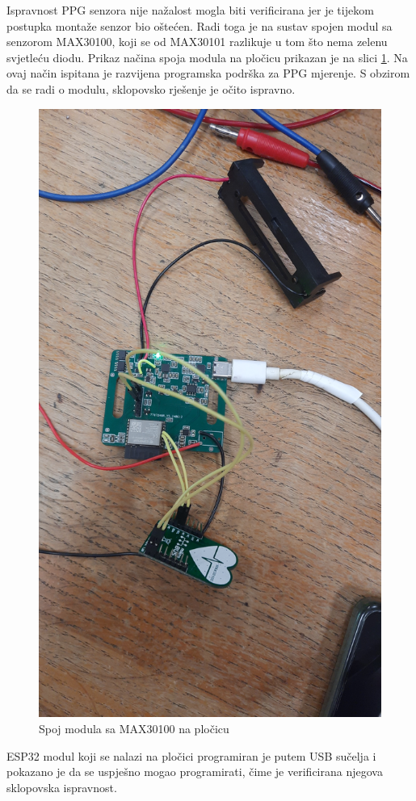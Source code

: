 Ispravnost PPG senzora nije nažalost mogla biti verificirana jer je tijekom postupka montaže senzor bio oštećen. Radi toga je na sustav spojen modul sa senzorom MAX30100, koji se od MAX30101 razlikuje u tom što nema zelenu svjetleću diodu. Prikaz načina spoja modula na pločicu prikazan je na slici \ref{slk:BR_TEST_05}. Na ovaj način ispitana je razvijena programska podrška za PPG mjerenje. S obzirom da se radi o modulu, sklopovsko rješenje je očito ispravno.
\begin{figure}
    \centering
    \includegraphics[width=10 cm]{Figures/BR_TEST_05.jpg}
    \caption{Spoj modula sa MAX30100 na pločicu}
    \label{slk:BR_TEST_05}
\end{figure}

ESP32 modul koji se nalazi na pločici programiran je putem USB sučelja i pokazano je da se uspješno mogao programirati, čime je verificirana njegova sklopovska ispravnost.